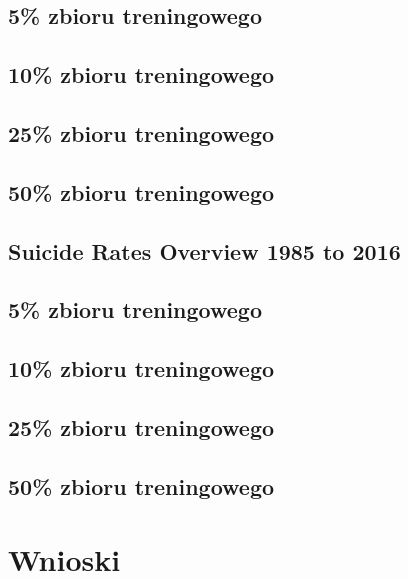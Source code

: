 \documentclass[a4paper,11pt]{article}
\begin{document}
\subsection*{5\% zbioru treningowego}
\subsection*{10\% zbioru treningowego}
\subsection*{25\% zbioru treningowego}
\subsection*{50\% zbioru treningowego}

\subsection{Suicide Rates Overview 1985 to 2016} 
\subsection*{5\% zbioru treningowego}
\subsection*{10\% zbioru treningowego}
\subsection*{25\% zbioru treningowego}
\subsection*{50\% zbioru treningowego}

\section{Wnioski}
\end{document}
